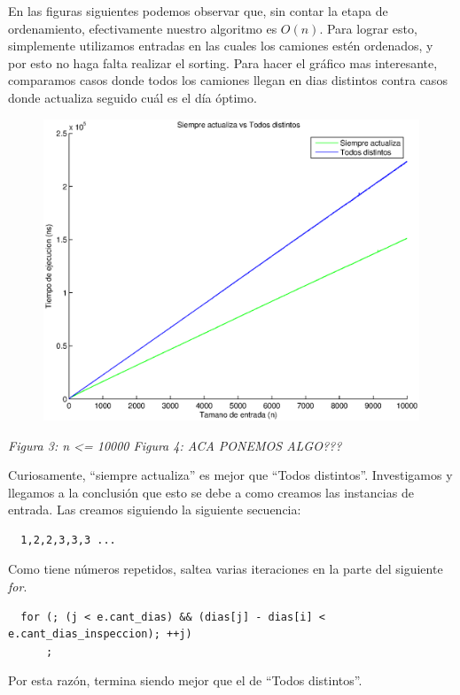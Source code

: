 En las figuras siguientes podemos observar que, sin contar la etapa de ordenamiento, efectivamente nuestro algoritmo es $O(n)$. Para lograr esto, simplemente utilizamos entradas en las cuales los camiones estén ordenados, y por esto no haga falta realizar el sorting. Para hacer el gráfico mas interesante, comparamos casos donde todos los camiones llegan en dias distintos contra casos donde actualiza seguido cuál es el día óptimo.

  \begin{figure}[H]
    \includegraphics[width=0.5\linewidth]{problema1/graficos/problema1_ordenada_siempre_actualiza_10000_vs_problema1_ordenada_todos_distintos_10000.eps}
\end{figure}
\emph{\hspace{2,5cm}Figura 3: n <= 10000 \hspace{3cm}Figura 4: ACA PONEMOS ALGO???}

Curiosamente, ``siempre actualiza'' es mejor que ``Todos distintos''. Investigamos y llegamos a la conclusión que esto se debe a como creamos las instancias de entrada. Las creamos siguiendo la siguiente secuencia:

\begin{verbatim}
  1,2,2,3,3,3 ...
\end{verbatim}

Como tiene números repetidos, saltea varias iteraciones en la parte del siguiente \emph{for}.

\begin{verbatim}
  for (; (j < e.cant_dias) && (dias[j] - dias[i] < e.cant_dias_inspeccion); ++j)
      ;
\end{verbatim}

Por esta razón, termina siendo mejor que el de ``Todos distintos''.
